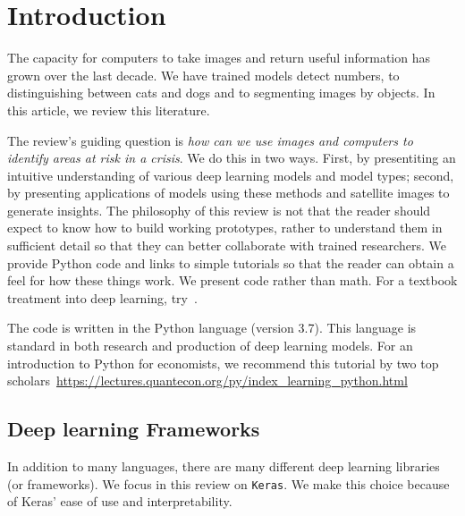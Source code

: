 \documentclass[12pt, a4paper, oneside, headinclude, footinclude]{article}
\begin{document}
\section{Introduction}

The capacity for computers to take images and return useful information has
grown over the last decade. We have trained models detect numbers, to
distinguishing between cats and dogs and to segmenting images by objects. In
this article, we review this literature.

The review's guiding question is \textit{how can we use
images and computers to identify areas at risk in a crisis}. We do this in
two ways. First, by presentiting an intuitive understanding of various deep
learning models and model types; second, by presenting applications of models
using these methods and satellite images to generate insights. The philosophy
of this review is not that the reader should expect to know how to build
working prototypes, rather to understand them in sufficient detail so that
they can better collaborate with trained researchers. We provide Python code and
links to simple tutorials so that the reader can obtain a feel for how these
things work. We present code rather than math. For a textbook treatment into
deep learning, try~\cite{lecun2015deep}.

The code is written in the Python language (version 3.7). This language is
standard in both research and production of deep learning models. For an
introduction to Python for economists, we recommend this tutorial by two
top
scholars~\url{https://lectures.quantecon.org/py/index_learning_python.html}


\subsection{Deep learning Frameworks}

In addition to many languages, there are many different deep learning
libraries (or frameworks). We focus in this review on \texttt{Keras}. We
make this choice because of Keras' ease of use and interpretability. 
\end{document}
